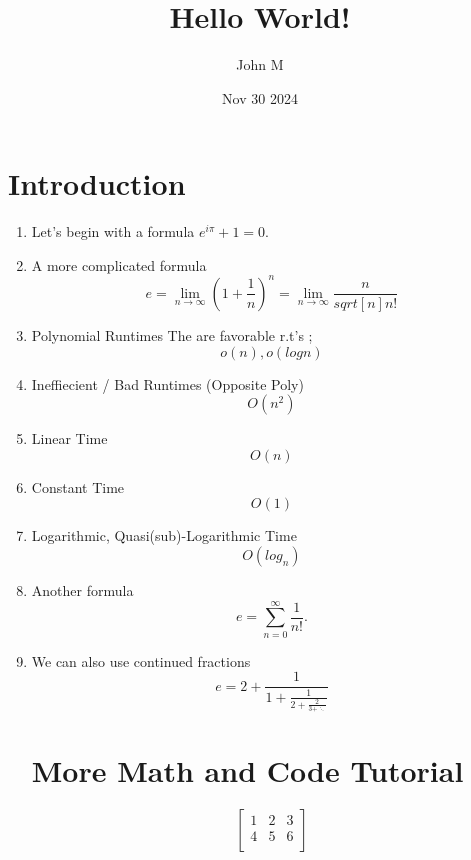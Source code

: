 \documentclass{article}
\title{Hello World!}
\author{John M}
\date{Nov 30 2024}
\begin{document}
\maketitle

	\section*{Introduction}

\begin{enumerate}
\item Let's begin with a formula $e^{i\pi}+1=0$.


\item A more complicated formula
$$ e= \lim_{n\to\infty} \left(1+\frac{1}{n}\right)^n =
\lim_{n\to\infty}\frac{n}{sqrt[n]{n!}}$$

\item Polynomial Runtimes
	The are favorable r.t's ; 
$$ o(n), o(log n)$$

\item Ineffiecient / Bad Runtimes 
	(Opposite Poly)
	$$ O(n^2)$$

\item Linear Time
$$ O(n)$$

\item Constant Time
$$ O(1)$$

\item Logarithmic, Quasi(sub)-Logarithmic Time
$$ O(log_n)$$

\item Another formula
$$e=\sum_{n=0}^{\infty} \frac{1}{n!}.$$

\item We can also use continued fractions
$$e=2+\frac{1}{1+\frac{1}{2+\frac{2}{3+\ddots}}}$$

		\section*{More Math and Code Tutorial}
$$\begin{bmatrix}
	1 & 2&3\\
	4 &5&6\\
\end{bmatrix}
$$

\end{enumerate}
\end{document}
